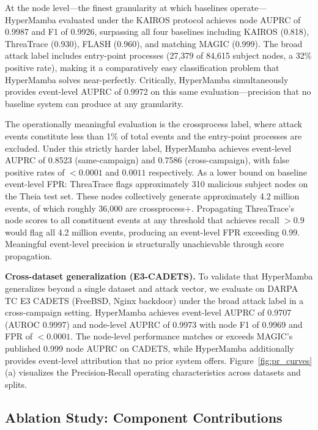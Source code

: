 \documentclass[letterpaper,twocolumn,10pt]{article}
\begin{document}
At the node level---the finest granularity at which baselines operate---HyperMamba evaluated under the KAIROS protocol achieves node AUPRC of 0.9987 and F1 of 0.9926, surpassing all four baselines including KAIROS (0.818), ThreaTrace (0.930), FLASH (0.960), and matching MAGIC (0.999). The broad attack label includes entry-point processes (27,379 of 84,615 subject nodes, a 32\% positive rate), making it a comparatively easy classification problem that HyperMamba solves near-perfectly. Critically, HyperMamba simultaneously provides event-level AUPRC of 0.9972 on this same evaluation---precision that no baseline system can produce at any granularity.

The operationally meaningful evaluation is the crossprocess label, where attack events constitute less than 1\% of total events and the entry-point processes are excluded. Under this strictly harder label, HyperMamba achieves event-level AUPRC of 0.8523 (same-campaign) and 0.7586 (cross-campaign), with false positive rates of $<0.0001$ and $0.0011$ respectively. As a lower bound on baseline event-level FPR: ThreaTrace flags approximately 310 malicious subject nodes on the Theia test set. These nodes collectively generate approximately 4.2 million events, of which roughly 36,000 are crossprocess+. Propagating ThreaTrace's node scores to all constituent events at any threshold that achieves recall $>0.9$ would flag all 4.2 million events, producing an event-level FPR exceeding 0.99. Meaningful event-level precision is structurally unachievable through score propagation.

\textbf{Cross-dataset generalization (E3-CADETS).} To validate that HyperMamba generalizes beyond a single dataset and attack vector, we evaluate on DARPA TC E3 CADETS (FreeBSD, Nginx backdoor) under the broad attack label in a cross-campaign setting. HyperMamba achieves event-level AUPRC of 0.9707 (AUROC 0.9997) and node-level AUPRC of 0.9973 with node F1 of 0.9969 and FPR of $<0.0001$. The node-level performance matches or exceeds MAGIC's published 0.999 node AUPRC on CADETS, while HyperMamba additionally provides event-level attribution that no prior system offers. Figure~\ref{fig:pr_curves}(a) visualizes the Precision-Recall operating characteristics across datasets and splits.



\subsection{Ablation Study: Component Contributions}
\label{sec:ablation}
\end{document}
